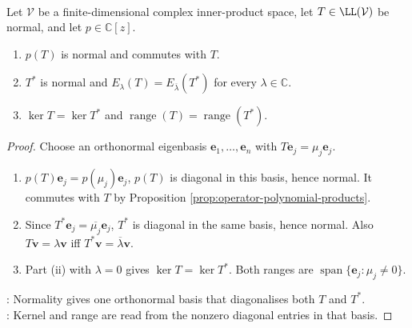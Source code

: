\begin{proposition} \label{prop:normal-polynomial-kernel-range-properties} \\
Let $\mathcal{V}$ be a finite-dimensional complex inner-product space, let $T\in\LL(\mathcal{V})$ be normal, and let $p\in\mathbb{C}[z]$.
\begin{enumerate}[label=(\roman*)]
\setlength{\itemsep}{0pt}
\item $p(T)$ is normal and commutes with $T$.
\item $T^*$ is normal and $E_{\lambda}(T)=E_{\overline{\lambda}}(T^*)$ for every $\lambda\in\mathbb{C}$.
\item $\ker T=\ker T^*$ and $\operatorname{range}(T)=\operatorname{range}(T^*)$.
\end{enumerate}
\begin{proof}
Choose an orthonormal eigenbasis $\mathbf{e}_1,\ldots,\mathbf{e}_n$ with $T\mathbf{e}_j=\mu_j\mathbf{e}_j$.
\begin{enumerate}[label=(\roman*)]
\setlength{\itemsep}{0pt}
\item $p(T)\mathbf{e}_j=p(\mu_j)\mathbf{e}_j$, $p(T)$ is diagonal in this basis, hence normal. It commutes with $T$ by Proposition \ref{prop:operator-polynomial-products}.
\item Since $T^*\mathbf{e}_j=\overline{\mu_j}\mathbf{e}_j$, $T^*$ is diagonal in the same basis, hence normal. Also $T\mathbf{v}=\lambda\mathbf{v}$ iff $T^*\mathbf{v}=\overline{\lambda}\mathbf{v}$.
\item Part (ii) with $\lambda=0$ gives $\ker T=\ker T^*$. Both ranges are $\operatorname{span}\{\mathbf{e}_j:\mu_j\neq0\}$.
\end{enumerate}
: Normality gives one orthonormal basis that diagonalises both $T$ and $T^*$.\\
: Kernel and range are read from the nonzero diagonal entries in that basis.
\end{proof}
\end{proposition}

